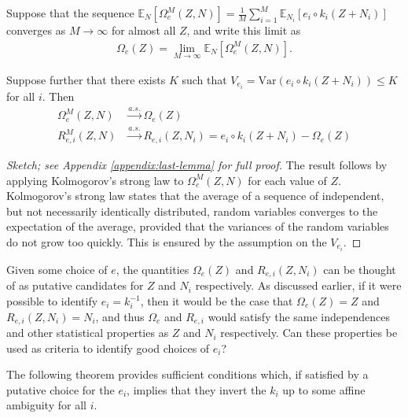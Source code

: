 \medskip

\begin{lemma}\label{lem:last-lemma}
	Suppose that the sequence $\mathbb{E}_{N}[\Omega_{e}^M(Z, N)] = \frac{1}{M}\sum_{i=1}^M \mathbb{E}_{N_i}[{e}_i\circ {k}_i( Z + N_i)] $ converges as $M \to \infty$ for almost all $Z$, and write this limit as
	\begin{align*}
	\Omega_e(Z) = \lim_{M\to\infty}\mathbb{E}_{N}[\Omega_{e}^M(Z, N)].
	\end{align*}
	
	Suppose further that there exists $K$ such that $V_{e_i} = \mathrm{Var}\left({e}_i \circ {k}_i(Z + N_i) \right) \leq K$ for all $i$.
	Then
	\begin{align*}
	\Omega_{e}^M(Z, N) & \overset{a.s.}{\longrightarrow} \Omega_{e}(Z) \\
	R_{e, i}^M(Z, N) & \overset{a.s.}{\longrightarrow} R_{e, i}(Z, N_i) = {e}_i\circ {k}_i( Z + N_i) - \Omega_{e}(Z)
	\end{align*}
\end{lemma}
\begin{proof}[Sketch; see Appendix \ref{appendix:last-lemma} for full proof]
The result follows by applying Kolmogorov's strong law to $\Omega_{e}^M(Z, N)$ for each value of $Z$.
Kolmogorov's strong law states that the average of a sequence of independent, but not necessarily identically distributed, random variables converges to the expectation of the average, provided that the variances of the random variables do not grow too quickly. 
This is ensured by the assumption on the $V_{e_i}$.
\end{proof}


Given some choice of ${e}$, the quantities $\Omega_{e}(Z)$ and $R_{e, i}(Z, N_i)$ can be thought of as putative candidates for $Z$ and $N_i$ respectively.
As discussed earlier, if it were possible to identify ${e}_i={k}_i^{-1}$, then it would be the case that $\Omega_{e}(Z) = Z$ and $R_{e, i}(Z, N_i) = N_i$, and thus $\Omega_{e}$ and $R_{e, i}$ would satisfy the same independences and other statistical properties as $Z$ and $N_i$ respectively.
Can these properties be used as criteria to identify good choices of ${e}_i$?

The following theorem provides sufficient conditions which, if satisfied by a putative choice for the $e_i$, implies that they invert the $k_i$ up to some affine ambiguity for all $i$. 

